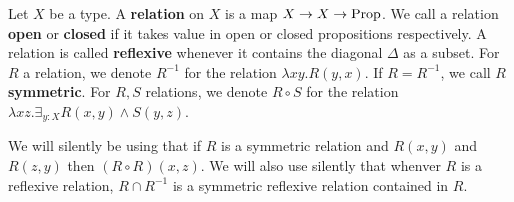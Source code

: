 \begin{definition}
  Let $X$ be a type. A \textbf{relation} on $X$ is a map $X \to X \to \mathrm{Prop}$. 
  We call a relation \textbf{open} or \textbf{closed} if it takes value in open or closed propositions respectively. 
  A relation is called \textbf{reflexive} whenever it contains the diagonal $\Delta$ as a subset.
  For $R$ a relation, we denote $R^{-1}$ for the relation $\lambda x y . R(y,x)$. If $R = R^{-1}$, we call $R$ \textbf{symmetric}.
  For $R,S$ relations, we denote $R \circ S$ for the relation $\lambda x z . \exists_{y:X} R(x,y) \wedge S(y,z)$. 
\end{definition}
\begin{remark}
  We will silently be using that if $R$ is a symmetric relation and $R(x,y)$ and $R(z,y)$ then $(R\circ R)(x,z)$. 
  We will also use silently that whenver $R$ is a reflexive relation, $R\cap R^{-1}$ is a symmetric reflexive relation contained in $R$. 
\end{remark}
